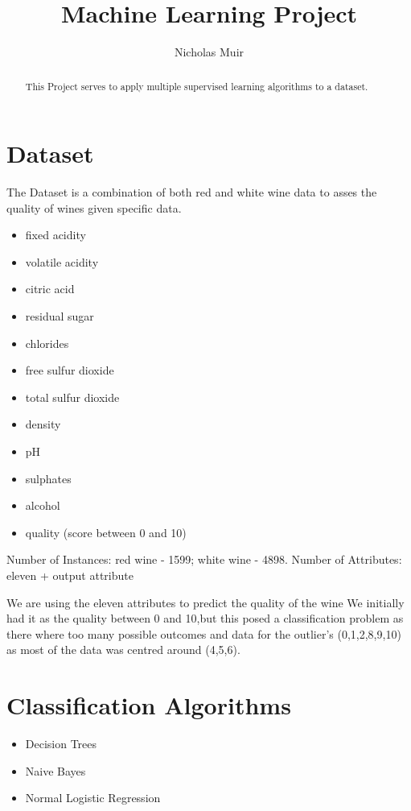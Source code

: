 \documentclass{article}
\title{Machine Learning Project}
\author{Nicholas Muir}
\begin{document}
\maketitle


\begin{abstract}
This Project serves to apply multiple supervised learning algorithms to a dataset.
\end{abstract}



\section{Dataset}

The Dataset is a combination of both red and white wine data to asses the quality of wines given specific data.

\begin{itemize}
\item fixed acidity
\item volatile acidity
\item citric acid
\item residual sugar
\item chlorides
\item free sulfur dioxide
\item total sulfur dioxide
\item density
\item pH
\item sulphates
\item alcohol
\item quality (score between 0 and 10)
\end{itemize}

Number of Instances: red wine - 1599; white wine - 4898.
Number of Attributes: eleven + output attribute

We are using the eleven attributes to predict the quality of the wine
We initially had it as the quality between 0 and 10,but this posed a classification problem as there where too many possible outcomes and data for the outlier's (0,1,2,8,9,10) as most of the data was centred around (4,5,6).


\section{Classification Algorithms}
\begin{itemize}
    \item Decision Trees
    \item Naive Bayes
    \item Normal Logistic Regression
\end{itemize}
\end{document}
